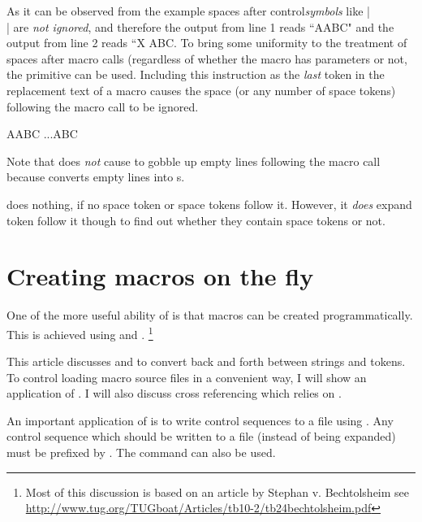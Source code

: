As it can be observed from the example spaces after control\textit{symbols} like |\\| are \emph{not ignored}, and therefore the output from line 1 reads ``AABC" and the output from line 2 reads ``X ABC. To bring some uniformity to the treatment of spaces after macro calls (regardless of whether the macro has parameters or not, the \cmd{\ignorespaces} primitive can be used. Including this instruction as the \emph{last} token in the replacement text of a macro causes the space (or any number of space tokens) following the macro call to be ignored.

\bgroup
\def\\{A\ignorespaces}
\def\yy{...\ignorespaces}

\\ABC
\yy{a}\ignorespaces ABC
\egroup

Note that \cmd{\ignorespaces} does \emph{not} cause \tex to gobble up empty lines following the macro call because \tex converts empty lines into s. 

\cmd{\ignorespaces} does nothing, if no space token or space tokens follow it.  However, it \emph{does} expand token follow it though to find out whether they contain space tokens or not.

\section{Creating macros on the fly}


One of the more useful ability of \tex is that macros can be created programmatically. This is achieved using  and .
\footnote{Most of this discussion is based on an article by Stephan v. Bechtolsheim see \url{http://www.tug.org/TUGboat/Articles/tb10-2/tb24bechtolsheim.pdf}}

This article discusses \cmd{\string} and \cmd{\csname} to
convert back and forth between strings and tokens.
To control loading macro source files in a convenient
way, I will show an application of \cmd{\csname}. I
will also discuss cross referencing which relies on
\cmd{\csname}.


An important application of \cmd{\string} is to
write control sequences to a file using \cmd{\write}.
Any control sequence which should be written
to a file (instead of being expanded) must be
prefixed by \cmd{\string}. The command \cmd{\noexpand} can also be used.

